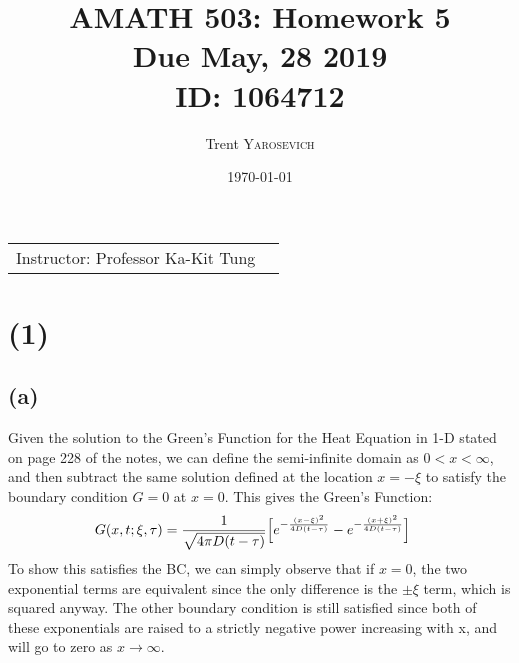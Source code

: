\documentclass{article}
\title{AMATH 503: Homework 5 \\Due May, 28 2019 \\ ID: 1064712} %
\author{Trent \textsc{Yarosevich}} %
\date{\today} %
\begin{document}
\maketitle %
\setlength\parindent{1cm}

\begin{center}
\begin{tabular}{l r}
Instructor: Professor Ka-Kit Tung %
\end{tabular}
\end{center}
\doublespacing

\section*{\textbf{(1)}}
\subsection*{\textbf{(a)}}
Given the solution to the Green's Function for the Heat Equation in 1-D stated on page 228 of the notes, we can define the semi-infinite domain as $0<x<\infty$, and then subtract the same solution defined at the location $x = -\xi$ to satisfy the boundary condition $G=0$ at $x=0$. This gives the Green's Function:
\begin{equation}
\begin{aligned}
G(x, t;\xi, \tau) &= \frac{1}{\sqrt{4\pi D(t-\tau)}}\Big{[} e^{-\frac{(x-\xi)^2}{4D(t-\tau)}} -e^{-\frac{(x+\xi)^2}{4D(t-\tau)}}\Big{]}
\end{aligned}
\end{equation}
To show this satisfies the BC, we can simply observe that if $x=0$, the two exponential terms are equivalent since the only difference is the $\pm\xi$ term, which is squared anyway. The other boundary condition is still satisfied since both of these exponentials are raised to a strictly negative power increasing with x, and will go to zero as $x\to\infty$.
\end{document}
